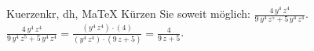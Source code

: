 \begin{MAufgabe}{Kuerzen}{kr, dh, MaTeX}
K\"urzen Sie soweit m\"oglich: $\frac{4\, y^4\, z^4}{9\, y^4\, z^5 + 5\, y^4\, z^4}$.\\ 
\ifLsg\MLoesung
\quad $\frac{4\, y^4\, z^4}{9\, y^4\, z^5 + 5\, y^4\, z^4}=\frac{(y^4\, z^4)\cdot(4)}{(y^4\, z^4)\cdot(9\, z + 5)}=\frac{4}{9\, z + 5}$.\else\relax\fi
 \end{MAufgabe}